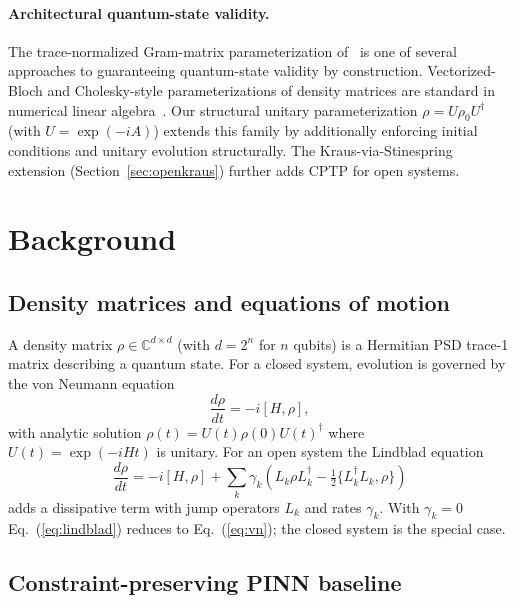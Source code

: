 \documentclass[11pt]{article}
\begin{document}
\paragraph{Architectural quantum-state validity.}
\begin{sloppypar}
The trace-normalized Gram-matrix parameterization of~\cite{hangen2024constraint} is one of several approaches to guaranteeing quantum-state validity by construction. Vectorized-Bloch and Cholesky-style parameterizations of density matrices are standard in numerical linear algebra~\cite{horn1990}. Our structural unitary parameterization $\rho = U \rho_0 U^\dagger$ (with $U = \exp(-i A)$) extends this family by additionally enforcing initial conditions and unitary evolution structurally. The Kraus-via-Stinespring extension (Section~\ref{sec:openkraus}) further adds CPTP for open systems.
\end{sloppypar}

\section{Background}

\subsection{Density matrices and equations of motion}

A density matrix $\rho \in \mathbb{C}^{d \times d}$ (with $d = 2^n$ for $n$ qubits) is a Hermitian PSD trace-1 matrix describing a quantum state. For a closed system, evolution is governed by the von Neumann equation
\begin{equation}
\frac{d\rho}{dt} = -i[H, \rho],
\label{eq:vn}
\end{equation}
with analytic solution $\rho(t) = U(t) \rho(0) U(t)^\dagger$ where $U(t) = \exp(-i H t)$ is unitary. For an open system the Lindblad equation
\begin{equation}
\frac{d\rho}{dt} = -i[H, \rho] + \sum_k \gamma_k \left( L_k \rho L_k^\dagger - \tfrac{1}{2} \{L_k^\dagger L_k, \rho\} \right)
\label{eq:lindblad}
\end{equation}
adds a dissipative term with jump operators $L_k$ and rates $\gamma_k$. With $\gamma_k = 0$ Eq.~(\ref{eq:lindblad}) reduces to Eq.~(\ref{eq:vn}); the closed system is the special case.

\subsection{Constraint-preserving PINN baseline}
\end{document}
